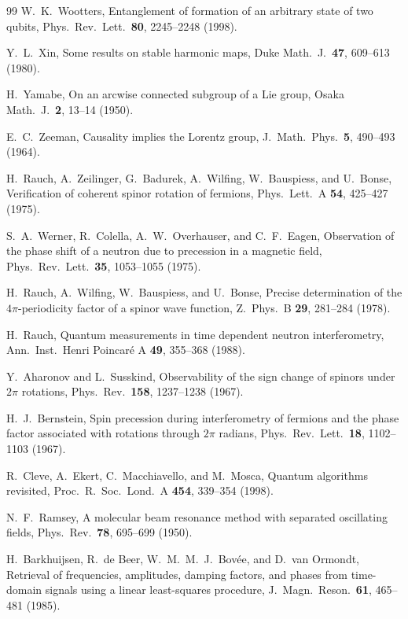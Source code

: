 \documentclass[aps,pra,onecolumn,superscriptaddress,nofootinbib,10pt]{revtex4-2}
\theoremstyle{definition}
\theoremstyle{remark}
\begin{document}
\begin{thebibliography}{99}
 W.~K.~Wootters, Entanglement of formation of an arbitrary state of two qubits, Phys.\ Rev.\ Lett.\ \textbf{80}, 2245--2248 (1998).

 Y.~L.~Xin, Some results on stable harmonic maps, Duke Math.\ J.\ \textbf{47}, 609--613 (1980).

 H.~Yamabe, On an arcwise connected subgroup of a Lie group, Osaka Math.\ J.\ \textbf{2}, 13--14 (1950).

 E.~C.~Zeeman, Causality implies the Lorentz group, J.\ Math.\ Phys.\ \textbf{5}, 490--493 (1964).


 H.~Rauch, A.~Zeilinger, G.~Badurek, A.~Wilfing, W.~Bauspiess, and U.~Bonse, Verification of coherent spinor rotation of fermions, Phys.\ Lett.\ A \textbf{54}, 425--427 (1975).

 S.~A.~Werner, R.~Colella, A.~W.~Overhauser, and C.~F.~Eagen, Observation of the phase shift of a neutron due to precession in a magnetic field, Phys.\ Rev.\ Lett.\ \textbf{35}, 1053--1055 (1975).

 H.~Rauch, A.~Wilfing, W.~Bauspiess, and U.~Bonse, Precise determination of the $4\pi$-periodicity factor of a spinor wave function, Z.\ Phys.\ B \textbf{29}, 281--284 (1978).

 H.~Rauch, Quantum measurements in time dependent neutron interferometry, Ann.\ Inst.\ Henri Poincar\'e A \textbf{49}, 355--368 (1988).

 Y.~Aharonov and L.~Susskind, Observability of the sign change of spinors under $2\pi$ rotations, Phys.\ Rev.\ \textbf{158}, 1237--1238 (1967).

 H.~J.~Bernstein, Spin precession during interferometry of fermions and the phase factor associated with rotations through $2\pi$ radians, Phys.\ Rev.\ Lett.\ \textbf{18}, 1102--1103 (1967).

 R.~Cleve, A.~Ekert, C.~Macchiavello, and M.~Mosca, Quantum algorithms revisited, Proc.\ R.\ Soc.\ Lond.\ A \textbf{454}, 339--354 (1998).

 N.~F.~Ramsey, A molecular beam resonance method with separated oscillating fields, Phys.\ Rev.\ \textbf{78}, 695--699 (1950).

 H.~Barkhuijsen, R.~de Beer, W.~M.~M.~J.~Bov\'ee, and D.~van Ormondt, Retrieval of frequencies, amplitudes, damping factors, and phases from time-domain signals using a linear least-squares procedure, J.\ Magn.\ Reson.\ \textbf{61}, 465--481 (1985).


\end{thebibliography}
\end{document}
